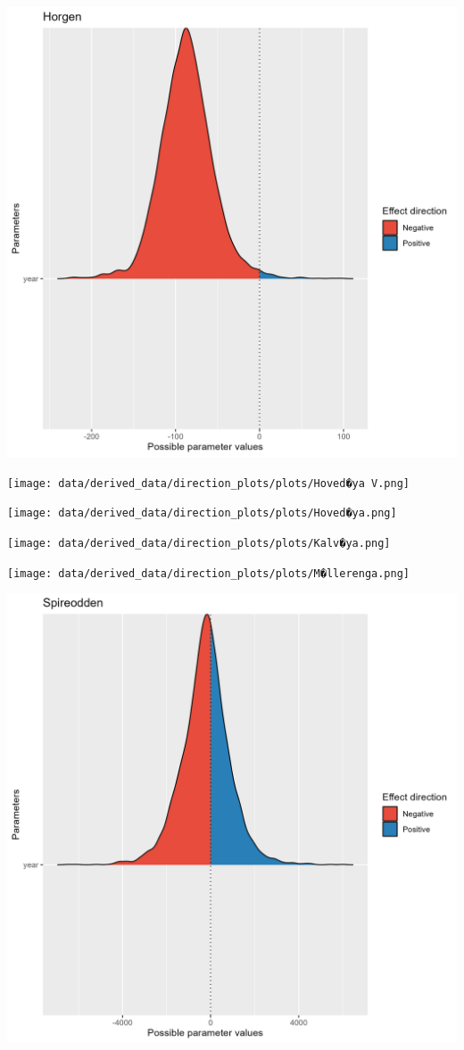 \documentclass[
  letterpaper,
  DIV=11,
  numbers=noendperiod]{scrreport}
\begin{document}
\includegraphics{data/derived_data/direction_plots/plots/Horgen.png}

\texttt{[image: data/derived\_data/direction\_plots/plots/Hoved�ya V.png]}

\texttt{[image: data/derived\_data/direction\_plots/plots/Hoved�ya.png]}

\texttt{[image: data/derived\_data/direction\_plots/plots/Kalv�ya.png]}

\texttt{[image: data/derived\_data/direction\_plots/plots/M�llerenga.png]}

\includegraphics{data/derived_data/direction_plots/plots/Spireodden.png}
\end{document}
